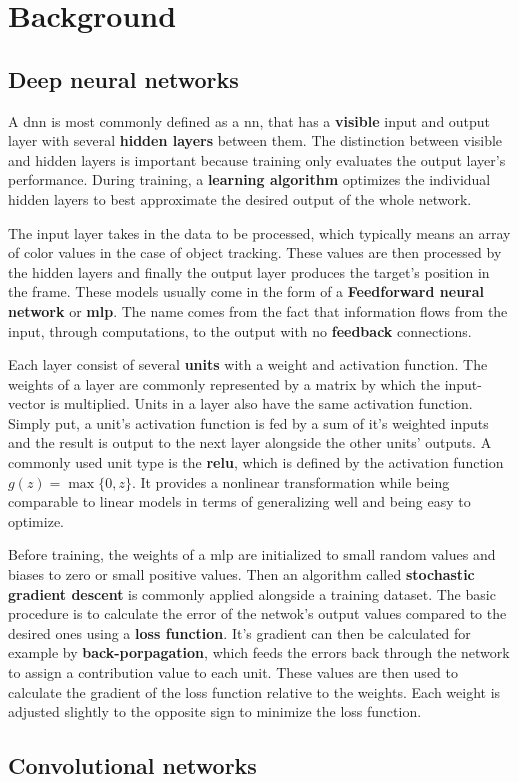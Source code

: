 \section{Background}

\subsection{Deep neural networks}

A \ac{dnn} is most commonly defined as a \ac{nn}, that has a \textbf{visible} input
and output layer with several \textbf{hidden layers} between them. The distinction
between visible and hidden layers is important because training only evaluates the
output layer's performance. During training, a \textbf{learning algorithm} optimizes the
individual hidden layers to best approximate the desired output of the whole network.

The input layer takes in the data to be processed, which typically means an array
of color values in the case of object tracking. These values are then processed
by the hidden layers and finally the output layer produces the target's position
in the frame. These models usually come in the form of a \textbf{Feedforward neural network}
or \textbf{\ac{mlp}}. The name comes from the fact that information flows from the
input, through computations, to the output with no \textbf{feedback} connections.
\\

Each layer consist of several \textbf{units} with a weight and activation function. The
weights of a layer are commonly represented by a matrix by which the input-vector is
multiplied. Units in a layer also have the same activation function. Simply put, a unit's
activation function is fed by a sum of it's weighted inputs and the result is output to 
the next layer alongside the other units' outputs. A commonly used unit type is the 
\textbf{\ac{relu}}, which is defined by the activation function $g (z) = \max\{0,z\}$.
It provides a nonlinear transformation while being comparable to linear models in terms
of generalizing well and being easy to optimize.

Before training, the weights of a \ac{mlp} are initialized to small random values and 
biases to zero or small positive values. Then an algorithm called \textbf{stochastic
gradient descent} is commonly applied alongside a training dataset. The basic procedure
is to calculate the error of the netwok's output values compared to the desired ones 
using a \textbf{loss function}. It's gradient can then be calculated for example by
\textbf{back-porpagation}, which feeds the errors back through the network to assign
a contribution value to each unit. These values are then used to calculate the
gradient of the loss function relative to the weights. Each weight is adjusted slightly
to the opposite sign to minimize the loss function.
\\\cite{DEEP_LEARNING}

\subsection{Convolutional networks}

